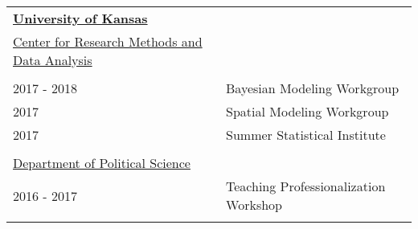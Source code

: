 \documentclass[margin,line,pifont,palatino,courier]{res}
\begin{document}
\begin{resume}
\begin{tabular}{ll}
  \textbf{\underline{University of Kansas}} &\\
  \underline{Center for Research Methods and Data Analysis} &\\
  \\
  2017 - 2018 & Bayesian Modeling Workgroup \\
  2017 & Spatial Modeling Workgroup\\
  2017 & Summer Statistical Institute\\
  \\
  \underline{Department of Political Science}\\
  2016 - 2017 & Teaching Professionalization Workshop\\
  \\
\end{tabular}






\end{resume}
\end{document}
